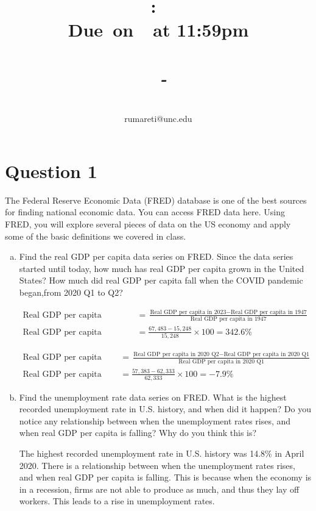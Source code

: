 \documentclass{article}
\title{
    \vspace{2in}
    \textmd{\textbf{\hmwkClass:\ \hmwkTitle}}\\
    \normalsize\vspace{0.1in}\small{\textbf{Due\ on\ \hmwkDueDate\ at 11:59pm}}\\
    \normalsize\text{Tuesday/Thursday 3:30-4:45, Genome Sciences 100}\\
    \vspace{0.1in}\large{\textit{\hmwkClassInstructor\ - \hmwkClassTime}}
    \vspace{3in}
}
\author{\hmwkAuthorName\\\small{rumareti@unc.edu}}
\date{}
\newcommand{\question}[1]{\pagebreak\section{Question #1}}
\begin{document}
\maketitle

\question{1}

The Federal Reserve Economic Data (FRED) database is one of the best sources for finding national economic data. You can access FRED data here. Using FRED, you will explore several pieces of data on the US economy and apply some of the basic definitions we covered in class.

\begin{enumerate}[(a)]
    \item Find the real GDP per capita data series on FRED. Since the data series started until today, how much has real GDP per capita
    grown in the United States? How much did real GDP per capita fall when the COVID pandemic began,from 2020 Q1 to Q2?

    \begin{align*}
        \text{Real GDP per capita growth} &= \frac{\text{Real GDP per capita in 2023} - \text{Real GDP per capita in 1947}}{\text{Real GDP per capita in 1947}} \\
        \text{Real GDP per capita growth} &= \frac{67,483 - 15,248}{15,248} \times 100 = 342.6\%
    \end{align*}

    \begin{align*}
        \text{Real GDP per capita fall} &= \frac{\text{Real GDP per capita in 2020 Q2} - \text{Real GDP per capita in 2020 Q1}}{\text{Real GDP per capita in 2020 Q1}} \\
        \text{Real GDP per capita fall} &= \frac{57,383 - 62,333}{62,333} \times 100 = -7.9\%
    \end{align*}
    
    \item Find the unemployment rate data series on FRED. What is the highest recorded unemployment rate in U.S. history, and when
    did it happen? Do you notice any relationship between when the unemployment rates rises, and when real GDP per capita is falling? Why do you think this is?

    The highest recorded unemployment rate in U.S. history was 14.8\% in April 2020. There is a relationship between when the unemployment rates rises, and when real GDP per capita is falling. This is because when the economy is in a recession, firms are not able to produce as much, and thus they lay off workers. This leads to a rise in unemployment rates.


\end{enumerate}
\end{document}
